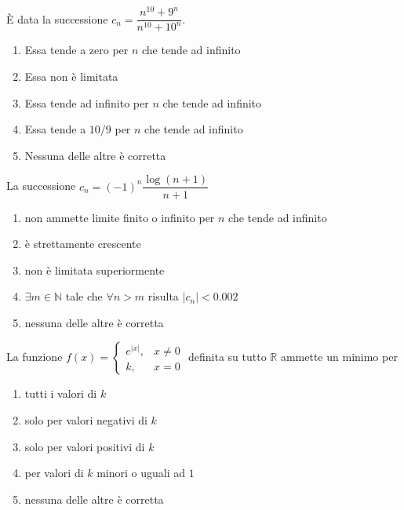 \begin{quiz}
\`E data la successione $c_n=\dfrac{n^{10}+9^n}{n^{10}+10^n}$.
\begin{enumerate}
\item Essa tende a zero per $n$ che tende ad infinito
\item Essa non \`e limitata
\item Essa tende ad infinito per $n$ che tende ad infinito
\item Essa tende a $10/9$ per $n$ che tende ad infinito
\item Nessuna delle altre \`e corretta
\end{enumerate}
\end{quiz}

\begin{quiz}
La successione $c_n=(-1)^n\dfrac{\log(n+1)}{n+1}$
\begin{enumerate}
\item non ammette limite finito o infinito per $n$ che tende ad infinito
\item \`e strettamente crescente
\item non \`e limitata superiormente
\item $\exists m\in\mathbb N$ tale che $\forall n>m$ risulta $|c_n|<0.002$
\item nessuna delle altre \`e corretta
\end{enumerate}
\end{quiz}

\begin{quiz}
La funzione $f(x)=\begin{cases}e^{|x|},&x\ne0\\k,&x=0\end{cases}$ definita su tutto $\mathbb R$ ammette un minimo per
\begin{enumerate}
\item tutti i valori di $k$
\item solo per valori negativi di $k$
\item solo per valori positivi di $k$
\item per valori di $k$ minori o uguali ad $1$
\item nessuna delle altre \`e corretta
\end{enumerate}
\end{quiz}

